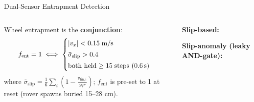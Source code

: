 \documentclass[aspectratio=169, 10pt]{beamer}
\newcommand{\teal}[1]{{\color{ArcticTeal}#1}}
\newcommand{\rust}[1]{{\color{MarsRust}#1}}
\begin{document}
\begin{frame}{Dual-Sensor Entrapment Detection}
\vspace{0.3em}
\begin{columns}[T]

\begin{tcolorbox}[mycard, title={\faTachometerAlt\; Formal Entrapment Criterion}]
  \scriptsize
  Wheel entrapment is the \textbf{conjunction}:
  \[
    f_\text{ent} = 1 \iff
    \begin{cases}
      |v_x| < 0.15\;\text{m/s}\\[2pt]
      \bar{\sigma}_\text{slip} > 0.4 \\[2pt]
      \text{both held} \geq 15\;\text{steps (0.6\,s)}
    \end{cases}
  \]
  where $\bar{\sigma}_\text{slip} = \frac{1}{6}\sum_{i}\!\left(1 - \frac{v_{\text{lin},i}}{\omega_i r}\right)$;
  $f_\text{ent}$ is pre-set to 1 at reset (rover spawns buried 15--28 cm).
\end{tcolorbox}

\vspace{0.25em}
\begin{tcolorbox}[mycard, title={\faSlidersH\; Dual Detection Mechanisms}]
  \scriptsize
  \teal{\faCircle} \textbf{Slip-based:}\;
  \vspace{3pt}

  \rust{\faCircle} \textbf{Slip-anomaly (leaky AND-gate):}\\[2pt]
\end{tcolorbox}



\end{columns}
\end{frame}
\end{document}
